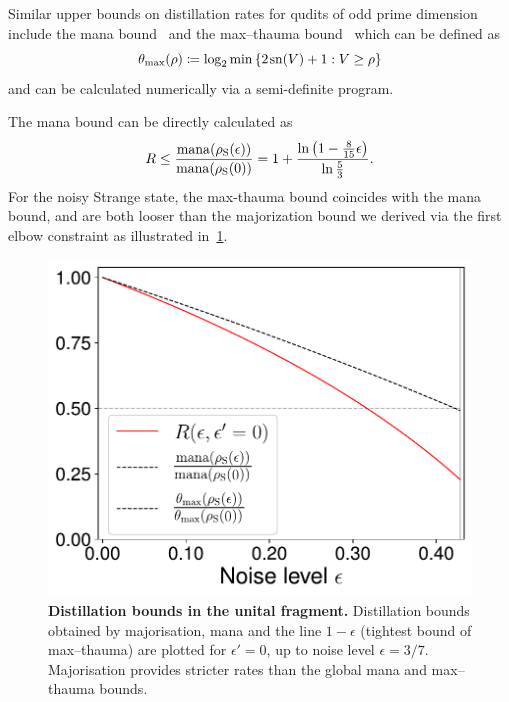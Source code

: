 \documentclass[pra,
aps,
twocolumn,
superscriptaddress,
groupedaddress,
nofootinbib,
reprint
]{revtex4-1}
\begin{document}
Similar upper bounds on distillation rates for qudits of odd prime dimension include the mana bound~\cite{cit:veitch} and the max--thauma bound~\cite{Wang_2020} which can be defined as
\begin{equation}
	\theta_{\rm{max}}(\rho) \coloneqq \log_2{\min{\{2\hspace{1pt} {{\rm{sn}}(V)} +1 : V \geq \rho\}}}
\end{equation}
and can be calculated numerically via a semi-definite program.

The mana bound can be directly calculated as
\begin{equation}
	R \leq \frac{{{\rm{mana}}(\rho_{\rm{S}}(\epsilon))}}{{{\rm{mana}}(\rho_{\rm{S}}(0))}} = 1 + \frac{\ln \left(1 - \frac{8}{15}\epsilon \right)}{\ln \frac{5}{3}}.
\end{equation}
For the noisy Strange state, the max-thauma bound coincides with the mana bound, and are both looser than the majorization bound we derived via the first elbow constraint as illustrated in~\cref{fig:distill_bounds}. 
\begin{figure}[t]
    \centering
    \includegraphics[scale=0.45]{figs/distill_bounds.pdf}
    \caption{\textbf{Distillation bounds in the unital fragment.} Distillation bounds obtained by majorisation, mana and the line $1-\epsilon$ (tightest bound of max--thauma) are plotted for $\epsilon' = 0$, up to noise level $\epsilon = 3/7$.
    Majorisation provides stricter rates than the global mana and max--thauma bounds.
    }
    \label{fig:distill_bounds}
\end{figure}
\end{document}
